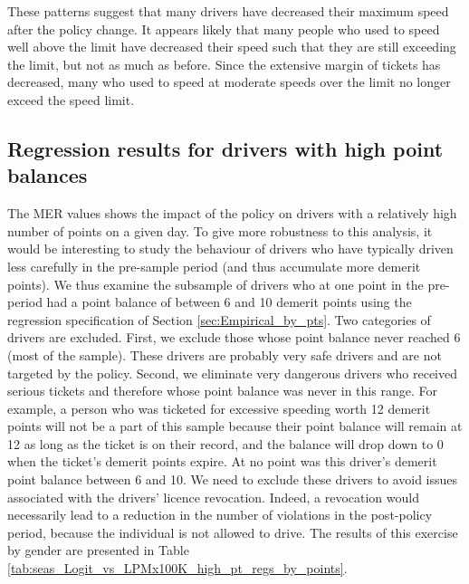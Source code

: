 These patterns suggest that many drivers have decreased their maximum speed 
after the policy change. 
It appears likely that many people who used to speed well above the limit 
have decreased their speed such that they are still exceeding the limit, 
but not as much as before. 
Since the extensive margin of tickets has decreased, many who used to speed at moderate speeds over the limit 
no longer exceed the speed limit.

\subsection{Regression results for drivers with high point balances}
\label{sec:Empirical_high_pts}





The MER values shows the impact of the policy on drivers with a relatively high number of points on a given day. To give more robustness to this analysis, it would be interesting to study the behaviour of drivers who have typically driven less carefully in the pre-sample period
(and thus accumulate more demerit points). 
We thus examine the subsample of drivers who at one point in the pre-period 
had a point balance of between 6 and 10 demerit points 
using the regression specification of 
Section \ref{sec:Empirical_by_pts}. 
Two categories of drivers are excluded. First, we exclude 
those whose point balance never reached 6 (most of the sample). These drivers are probably very safe drivers and are not targeted by the policy. Second, we eliminate very dangerous drivers who received serious tickets and therefore whose point balance was never in this range.
For example, a person who was ticketed for excessive speeding worth 12 demerit points 
will not be a part of this sample because their point balance will remain at 12 
as long as the ticket is on their record, 
and the balance will drop down to 0 when the ticket’s demerit points expire. 
At no point was this driver’s demerit point balance between 6 and 10. 
We need to exclude these drivers to avoid issues associated with the drivers’ licence revocation. 
Indeed, a revocation would necessarily lead to a reduction in the number of violations 
in the post-policy period, because the individual is not allowed to drive. 
The results of this exercise by gender are presented in 
Table \ref{tab:seas_Logit_vs_LPMx100K_high_pt_regs_by_points}. 

